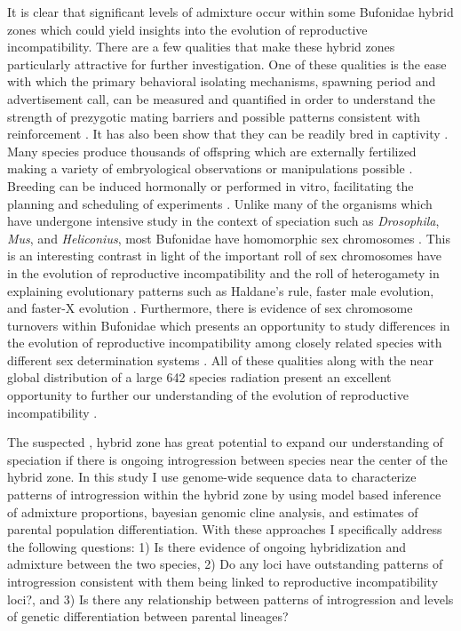It is clear that significant levels of admixture occur within some Bufonidae 
hybrid zones which could yield insights into the evolution of reproductive incompatibility. 
There are a few qualities that make these hybrid zones particularly attractive for further investigation.
One of these qualities is the ease with which the primary behavioral isolating mechanisms, 
spawning period and advertisement call, can be measured and quantified in order 
to understand the strength of prezygotic mating barriers and possible patterns 
consistent with reinforcement \parencite{cocroft1995,blair1974,kennedy1962}.
It has also been show that they can be readily bred in captivity \parencite{blair1972}. 
Many species produce thousands of offspring which are externally fertilized  
making a variety of embryological observations or manipulations possible \parencite{blair1972}.
Breeding can be induced hormonally or performed in vitro, facilitating the 
planning and scheduling of experiments \parencite{trudeau2010}.
Unlike many of the organisms which have undergone intensive study in the context 
of speciation such as \textit{Drosophila}, \textit{Mus}, and \textit{Heliconius},
most Bufonidae have homomorphic sex chromosomes \parencite{blair1972}. 
This is an interesting contrast in light of the important roll of sex chromosomes
have in the evolution of reproductive incompatibility and the roll of heterogamety
in explaining evolutionary patterns such as Haldane's rule, faster male evolution,
and faster-X evolution \parencite{delph2016}. 
Furthermore, there is evidence of sex chromosome turnovers within Bufonidae
which presents an opportunity to study differences in the evolution of  
reproductive incompatibility among closely related species with different 
sex determination systems \parencite{dufresnes2020,stock2011}. 
All of these qualities along with the near global distribution of a large 642 species  
radiation present an excellent opportunity to further our understanding of the 
evolution of reproductive incompatibility \parencite{amphibiaweb2023}.


The suspected \amer, \terr hybrid zone has great potential to expand our 
understanding of speciation if there is ongoing introgression between species
near the center of the hybrid zone.
In this study I use genome-wide sequence data to characterize patterns of  
introgression within the hybrid zone by using model based inference of admixture
proportions, bayesian genomic cline analysis, and estimates of parental population differentiation.
With these approaches I specifically address the following questions: 
1) Is there evidence of ongoing hybridization and admixture between the two species,
2) Do any loci have outstanding patterns of introgression consistent with them
being linked to reproductive incompatibility loci?, and
3) Is there any relationship between patterns of introgression and levels 
of genetic differentiation between parental lineages?


